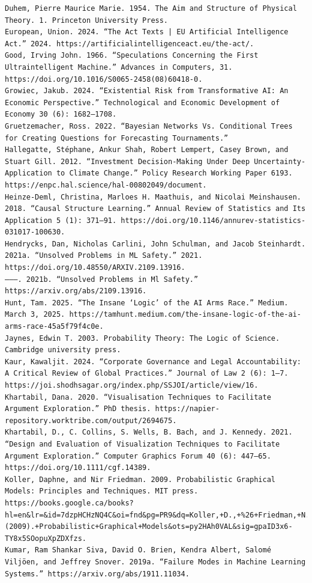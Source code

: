 \documentclass[
  11pt,
  letterpaper,
]{book}
\begin{document}
\begin{verbatim}
Duhem, Pierre Maurice Marie. 1954. The Aim and Structure of Physical Theory. 1. Princeton University Press.
European, Union. 2024. “The Act Texts | EU Artificial Intelligence Act.” 2024. https://artificialintelligenceact.eu/the-act/.
Good, Irving John. 1966. “Speculations Concerning the First Ultraintelligent Machine.” Advances in Computers, 31. https://doi.org/10.1016/S0065-2458(08)60418-0.
Growiec, Jakub. 2024. “Existential Risk from Transformative AI: An Economic Perspective.” Technological and Economic Development of Economy 30 (6): 1682–1708.
Gruetzemacher, Ross. 2022. “Bayesian Networks Vs. Conditional Trees for Creating Questions for Forecasting Tournaments.”
Hallegatte, Stéphane, Ankur Shah, Robert Lempert, Casey Brown, and Stuart Gill. 2012. “Investment Decision-Making Under Deep Uncertainty-Application to Climate Change.” Policy Research Working Paper 6193. https://enpc.hal.science/hal-00802049/document.
Heinze-Deml, Christina, Marloes H. Maathuis, and Nicolai Meinshausen. 2018. “Causal Structure Learning.” Annual Review of Statistics and Its Application 5 (1): 371–91. https://doi.org/10.1146/annurev-statistics-031017-100630.
Hendrycks, Dan, Nicholas Carlini, John Schulman, and Jacob Steinhardt. 2021a. “Unsolved Problems in ML Safety.” 2021. https://doi.org/10.48550/ARXIV.2109.13916.
———. 2021b. “Unsolved Problems in Ml Safety.” https://arxiv.org/abs/2109.13916.
Hunt, Tam. 2025. “The Insane ‘Logic’ of the AI Arms Race.” Medium. March 3, 2025. https://tamhunt.medium.com/the-insane-logic-of-the-ai-arms-race-45a5f79f4c0e.
Jaynes, Edwin T. 2003. Probability Theory: The Logic of Science. Cambridge university press.
Kaur, Kawaljit. 2024. “Corporate Governance and Legal Accountability: A Critical Review of Global Practices.” Journal of Law 2 (6): 1–7. https://joi.shodhsagar.org/index.php/SSJOI/article/view/16.
Khartabil, Dana. 2020. “Visualisation Techniques to Facilitate Argument Exploration.” PhD thesis. https://napier-repository.worktribe.com/output/2694675.
Khartabil, D., C. Collins, S. Wells, B. Bach, and J. Kennedy. 2021. “Design and Evaluation of Visualization Techniques to Facilitate Argument Exploration.” Computer Graphics Forum 40 (6): 447–65. https://doi.org/10.1111/cgf.14389.
Koller, Daphne, and Nir Friedman. 2009. Probabilistic Graphical Models: Principles and Techniques. MIT press. https://books.google.ca/books?hl=en&lr=&id=7dzpHCHzNQ4C&oi=fnd&pg=PR9&dq=Koller,+D.,+%26+Friedman,+N.+(2009).+Probabilistic+Graphical+Models&ots=py2HAh0VAL&sig=gpaID3x6-TY8x5SOopuXpZDXfzs.
Kumar, Ram Shankar Siva, David O. Brien, Kendra Albert, Salomé Viljöen, and Jeffrey Snover. 2019a. “Failure Modes in Machine Learning Systems.” https://arxiv.org/abs/1911.11034.

\end{verbatim}
\end{document}
